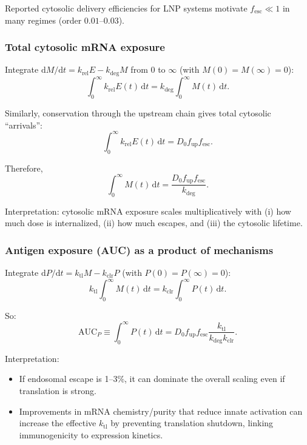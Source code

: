 Reported cytosolic delivery efficiencies for LNP systems motivate $f_{\mathrm{esc}} \ll 1$ in many regimes (order $0.01$--$0.03$). \parencite{Pei2025EndosomalEscapeLNP}

\subsubsection*{Total cytosolic mRNA exposure}

Integrate $\mathrm{d}M/\mathrm{d}t = k_{\mathrm{rel}}E - k_{\mathrm{deg}}M$ from $0$ to $\infty$ (with $M(0)=M(\infty)=0$):
\begin{equation}
\int_0^{\infty} k_{\mathrm{rel}}E(t)\,\mathrm{d}t = k_{\mathrm{deg}}\int_0^{\infty} M(t)\,\mathrm{d}t.
\end{equation}

Similarly, conservation through the upstream chain gives total cytosolic ``arrivals'':
\begin{equation}
\int_0^{\infty} k_{\mathrm{rel}}E(t)\,\mathrm{d}t = D_0 f_{\mathrm{up}} f_{\mathrm{esc}}.
\end{equation}

Therefore,
\begin{equation}
\int_0^{\infty} M(t)\,\mathrm{d}t = \frac{D_0 f_{\mathrm{up}} f_{\mathrm{esc}}}{k_{\mathrm{deg}}}.
\end{equation}

Interpretation: cytosolic mRNA exposure scales multiplicatively with (i) how much dose is internalized, (ii) how much escapes, and (iii) the cytosolic lifetime.

\subsubsection*{Antigen exposure (AUC) as a product of mechanisms}

Integrate $\mathrm{d}P/\mathrm{d}t = k_{\mathrm{tl}}M - k_{\mathrm{clr}}P$ (with $P(0)=P(\infty)=0$):
\begin{equation}
 k_{\mathrm{tl}}\int_0^{\infty} M(t)\,\mathrm{d}t = k_{\mathrm{clr}}\int_0^{\infty} P(t)\,\mathrm{d}t.
\end{equation}

So:
\begin{equation}
\mathrm{AUC}_P \equiv \int_0^{\infty} P(t)\,\mathrm{d}t = D_0 f_{\mathrm{up}} f_{\mathrm{esc}}\frac{k_{\mathrm{tl}}}{k_{\mathrm{deg}}k_{\mathrm{clr}}}.
\end{equation}

Interpretation:
\begin{itemize}
    \item If endosomal escape is 1--3\%, it can dominate the overall scaling even if translation is strong. \parencite{Pei2025EndosomalEscapeLNP}
    \item Improvements in mRNA chemistry/purity that reduce innate activation can increase the effective $k_{\mathrm{tl}}$ by preventing translation shutdown, linking immunogenicity to expression kinetics. \parencite{Nelson2020mRNAChemistryInnateImmunity}
\end{itemize}


